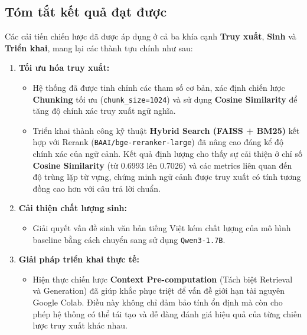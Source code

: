 \subsection{Tóm tắt kết quả đạt được}

Các cải tiến chiến lược đã được áp dụng ở cả ba khía cạnh \textbf{Truy xuất}, \textbf{Sinh} và \textbf{Triển khai}, mang
lại các thành tựu chính như sau:

\begin{enumerate}
    \item \textbf{Tối ưu hóa truy xuất:}
    \begin{itemize}
        \item Hệ thống đã được tinh chỉnh các tham số cơ bản, xác định chiến lược \textbf{Chunking} tối
        ưu (\texttt{chunk\_size=1024}) và sử dụng \textbf{Cosine Similarity} để tăng độ chính xác truy xuất
        ngữ nghĩa.

        \item Triển khai thành công kỹ thuật \textbf{Hybrid Search (FAISS + BM25)} kết hợp với Rerank
        (\texttt{BAAI/bge-reranker-large}) đã nâng cao đáng kể độ chính xác của ngữ cảnh. Kết
        quả định lượng cho thấy sự cải thiện ở chỉ số \textbf{Cosine Similarity} (từ 0.6993 lên 0.7026)
        và các metrics liên quan đến độ trùng lặp từ vựng, chứng minh ngữ cảnh được truy
        xuất có tính tương đồng cao hơn với câu trả lời chuẩn.
    \end{itemize}

    \item \textbf{Cải thiện chất lượng sinh:}
    \begin{itemize}
        \item Giải quyết vấn đề sinh văn bản tiếng Việt kém chất lượng của mô hình baseline bằng
        cách chuyển sang sử dụng \texttt{Qwen3-1.7B}.
    \end{itemize}

    \item \textbf{Giải pháp triển khai thực tế:}
    \begin{itemize}
        \item Hiện thực chiến lược \textbf{Context Pre-computation} (Tách biệt Retrieval và Generation)
        đã giúp khắc phục triệt để vấn đề giới hạn tài nguyên Google Colab. Điều này không
        chỉ đảm bảo tính ổn định mà còn cho phép hệ thống có thể tái tạo và dễ dàng đánh
        giá hiệu quả của từng chiến lược truy xuất khác nhau.
    \end{itemize}
\end{enumerate}